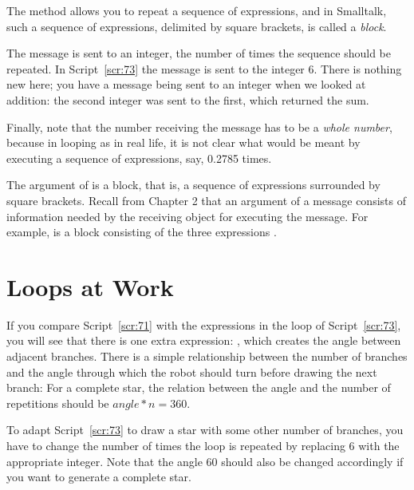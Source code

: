 \documentclass[a4paper,10pt,twoside]{book}
\begin{document}

The method  allows you to repeat a sequence of expressions, and in 
Smalltalk, such a sequence of expressions, delimited by square brackets, is called a \emph{block}. 

The message  is sent to an integer, the number of times the sequence should 
be repeated. In Script~\ref{scr:73} the message  is sent to the integer 6. There is 
nothing new here; you have a message being sent to an integer when we looked at addition: 
the second integer was sent to the first, which returned the sum. 

Finally, note that the number receiving the message  has to be a \emph{whole 
number}, because in looping as in real life, it is not clear what would be meant by executing a 
sequence of expressions, say, 0.2785 times. 

The argument of  is a block, that is, a sequence of expressions surrounded 
by square brackets. Recall from Chapter 2 that an argument of a message consists of information needed by the receiving object for executing the message. For example,  is a block consisting of the three expressions . 



\section{Loops at Work} 

If you compare Script~\ref{scr:71} with the expressions in the loop of Script~\ref{scr:73}, you will see that 
there is one extra expression: , which creates the angle between adjacent 
branches. There is a simple relationship between the number of branches and the angle 
through which the robot should turn before drawing the next branch: For a complete star, 
the relation between the angle and the number of repetitions should be $angle*n = 360$. 

To adapt Script~\ref{scr:73} to draw a star with some other number of branches, you have to change 
the number of times the loop is repeated by replacing $6$ with the appropriate integer. Note that 
the angle $60$ should also be changed accordingly if you want to generate a complete star. 
\end{document}
